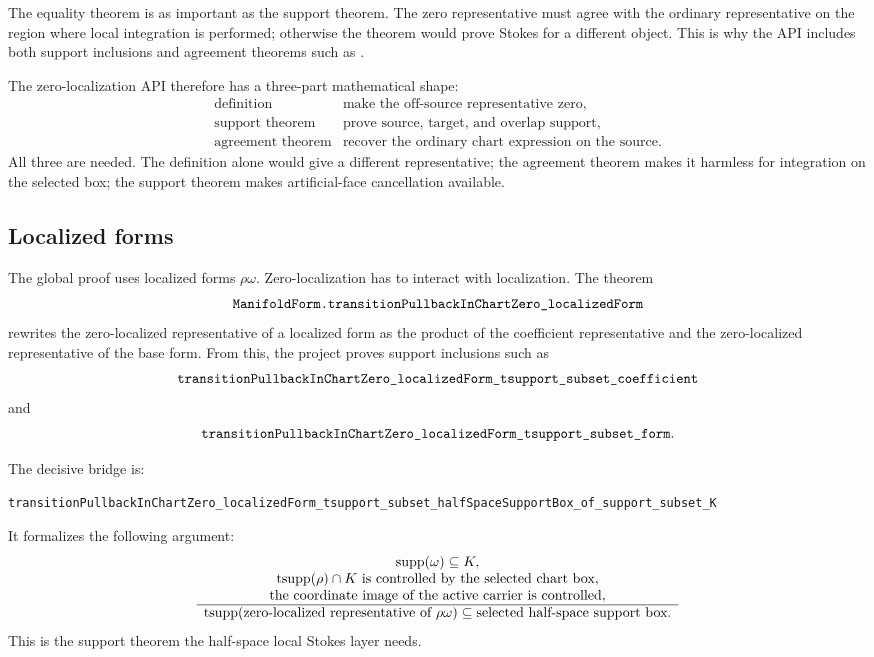 The equality theorem is as important as the support theorem.  The zero
representative must agree with the ordinary representative on the region where
local integration is performed; otherwise the theorem would prove Stokes for a
different object.  This is why the API includes both support inclusions and
agreement theorems such as
.

The zero-localization API therefore has a three-part mathematical shape:
\[
\begin{array}{ll}
\text{definition} & \text{make the off-source representative zero},\\
\text{support theorem} & \text{prove source, target, and overlap support},\\
\text{agreement theorem} & \text{recover the ordinary chart expression on the
source}.
\end{array}
\]
All three are needed.  The definition alone would give a different
representative; the agreement theorem makes it harmless for integration on
the selected box; the support theorem makes artificial-face cancellation
available.

\subsection{Localized forms}

The global proof uses localized forms \(\rho\omega\).  Zero-localization has to
interact with localization.  The theorem
\[
\code{ManifoldForm.transitionPullbackInChartZero_localizedForm}
\]
rewrites the zero-localized representative of a localized form as the product
of the coefficient representative and the zero-localized representative of the
base form.  From this, the project proves support inclusions such as
\[
\code{transitionPullbackInChartZero_localizedForm_tsupport_subset_coefficient}
\]
and
\[
\code{transitionPullbackInChartZero_localizedForm_tsupport_subset_form}.
\]

The decisive bridge is:
\begin{lstlisting}[language=Lean,basicstyle=\ttfamily\scriptsize]
transitionPullbackInChartZero_localizedForm_tsupport_subset_halfSpaceSupportBox_of_support_subset_K
\end{lstlisting}
It formalizes the following argument:
\[
\begin{array}{c}
\operatorname{supp}(\omega)\subseteq K,\\
\operatorname{tsupp}(\rho)\cap K\text{ is controlled by the selected chart box},\\
\text{the coordinate image of the active carrier is controlled},\\
\hline
\operatorname{tsupp}(\text{zero-localized representative of }\rho\omega)
  \subseteq \text{selected half-space support box}.
\end{array}
\]
This is the support theorem the half-space local Stokes layer needs.

